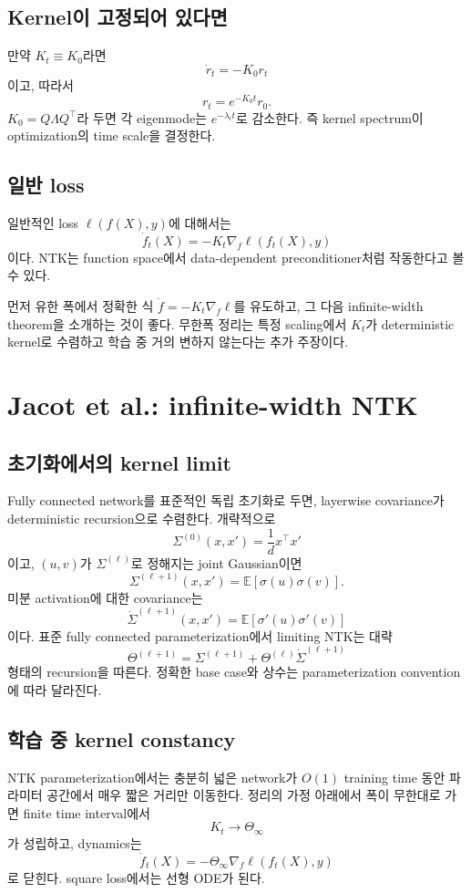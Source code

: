 \documentclass[11pt,a4paper,oneside,openany]{memoir}
\newcommand{\E}{\mathbb{E}}
\theoremstyle{definition}
\begin{document}
\section{Kernel이 고정되어 있다면}
만약 $K_t\equiv K_0$라면
\[
\dot r_t=-K_0r_t
\]
이고, 따라서
\[
\boxed{r_t=e^{-K_0t}r_0.}
\]
$K_0=Q\Lambda Q^\top$라 두면 각 eigenmode는 $e^{-\lambda_i t}$로 감소한다. 즉 kernel spectrum이 optimization의 time scale을 결정한다.

\section{일반 loss}
일반적인 loss $\ell(f(X),y)$에 대해서는
\[
\dot f_t(X)=-K_t\nabla_f\ell(f_t(X),y)
\]
이다. NTK는 function space에서 data-dependent preconditioner처럼 작동한다고 볼 수 있다.

\begin{presentbox}
먼저 유한 폭에서 정확한 식 $\dot f=-K_t\nabla_f\ell$를 유도하고, 그 다음 infinite-width theorem을 소개하는 것이 좋다. 무한폭 정리는 특정 scaling에서 $K_t$가 deterministic kernel로 수렴하고 학습 중 거의 변하지 않는다는 추가 주장이다.
\end{presentbox}

\chapter{Jacot et al.: infinite-width NTK}
\section{초기화에서의 kernel limit}
Fully connected network를 표준적인 독립 초기화로 두면, layerwise covariance가 deterministic recursion으로 수렴한다. 개략적으로
\[
\Sigma^{(0)}(x,x')=\frac1d x^\top x'
\]
이고, $(u,v)$가 $\Sigma^{(\ell)}$로 정해지는 joint Gaussian이면
\[
\Sigma^{(\ell+1)}(x,x')=\E[\sigma(u)\sigma(v)].
\]
미분 activation에 대한 covariance는
\[
\dot\Sigma^{(\ell+1)}(x,x')=\E[\sigma'(u)\sigma'(v)]
\]
이다. 표준 fully connected parameterization에서 limiting NTK는 대략
\[
\Theta^{(\ell+1)}
=\Sigma^{(\ell+1)}+\Theta^{(\ell)}\dot\Sigma^{(\ell+1)}
\]
형태의 recursion을 따른다. 정확한 base case와 상수는 parameterization convention에 따라 달라진다.

\section{학습 중 kernel constancy}
NTK parameterization에서는 충분히 넓은 network가 $O(1)$ training time 동안 파라미터 공간에서 매우 짧은 거리만 이동한다. 정리의 가정 아래에서 폭이 무한대로 가면 finite time interval에서
\[
K_t\longrightarrow \Theta_\infty
\]
가 성립하고, dynamics는
\[
\dot f_t(X)=-\Theta_\infty\nabla_f\ell(f_t(X),y)
\]
로 닫힌다. square loss에서는 선형 ODE가 된다.
\end{document}
